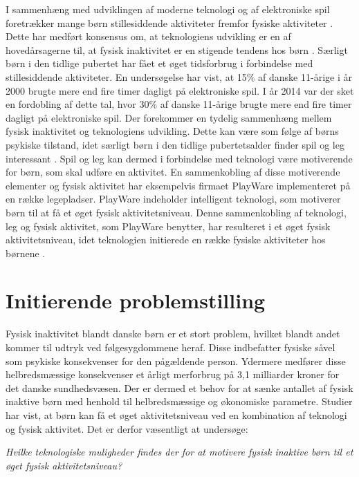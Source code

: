 I sammenhæng med udviklingen af moderne teknologi og af elektroniske spil foretrækker mange børn stillesiddende aktiviteter fremfor fysiske aktiviteter \citep{Universitet2014}. Dette har medført konsensus om, at teknologiens udvikling er en af hovedårsagerne til, at fysisk inaktivitet er en stigende tendens hos børn \citep{Kiens2007}.
Særligt børn i den tidlige pubertet har fået et øget tidsforbrug i forbindelse med stillesiddende aktiviteter. En undersøgelse har vist, at 15\% af danske 11-årige i år 2000 brugte mere end fire timer dagligt på elektroniske spil. I år 2014 var der sket en fordobling af dette tal, hvor 30\% af danske 11-årige brugte mere end fire timer dagligt på elektroniske spil. \citep{Universitet2014} \newline
Der forekommer en tydelig sammenhæng mellem fysisk inaktivitet og teknologiens udvikling. Dette kan være som følge af børns psykiske tilstand, idet særligt børn i den tidlige pubertetsalder finder spil og leg interessant \citep{Wied2011}. Spil og leg kan dermed i forbindelse med teknologi være motiverende for børn, som skal udføre en aktivitet. En sammenkobling af disse motiverende elementer og fysisk aktivitet har eksempelvis firmaet PlayWare implementeret på en række legepladser. PlayWare indeholder intelligent teknologi, som motiverer børn til at få et øget fysisk aktivitetsniveau. Denne sammenkobling af teknologi, leg og fysisk aktivitet, som PlayWare benytter, har resulteret i et øget fysisk aktivitetsniveau, idet teknologien initierede en række fysiske aktiviteter hos børnene \citep{Rishoej2010}. 

\section{Initierende problemstilling}
Fysisk inaktivitet blandt danske børn er et stort problem, hvilket blandt andet kommer til udtryk ved følgesygdommene heraf. Disse indbefatter fysiske såvel som psykiske konsekvenser for den pågældende person. Ydermere medfører disse helbredsmæssige konsekvenser et årligt merforbrug på 3,1 milliarder kroner for det danske sundhedsvæsen. Der er dermed et behov for at sænke antallet af fysisk inaktive børn med henhold til helbredsmæssige og økonomiske parametre. Studier har vist, at børn kan få et øget aktivitetsniveau ved en kombination af teknologi og fysisk aktivitet. Det er derfor væsentligt at undersøge: 

\begin{center}
\textit{Hvilke teknologiske muligheder findes der for at motivere fysisk inaktive børn til et øget fysisk aktivitetsniveau?}
\end{center}